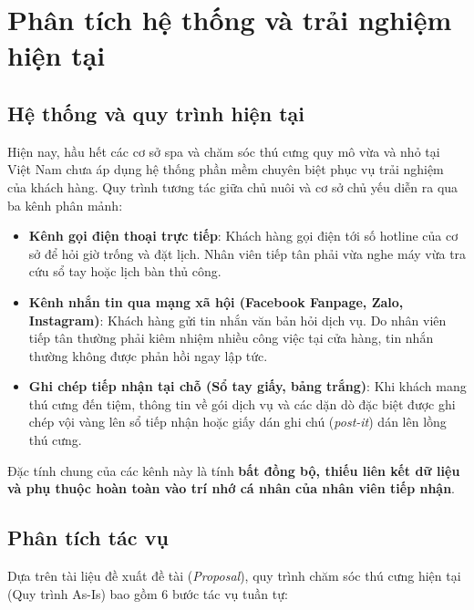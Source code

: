 \section{Phân tích hệ thống và trải nghiệm hiện tại}

\subsection{Hệ thống và quy trình hiện tại}
Hiện nay, hầu hết các cơ sở spa và chăm sóc thú cưng quy mô vừa và nhỏ tại Việt Nam chưa áp dụng hệ thống phần mềm chuyên biệt phục vụ trải nghiệm của khách hàng. Quy trình tương tác giữa chủ nuôi và cơ sở chủ yếu diễn ra qua ba kênh phân mảnh:
\begin{itemize}
    \item \textbf{Kênh gọi điện thoại trực tiếp}: Khách hàng gọi điện tới số hotline của cơ sở để hỏi giờ trống và đặt lịch. Nhân viên tiếp tân phải vừa nghe máy vừa tra cứu sổ tay hoặc lịch bàn thủ công.
    \item \textbf{Kênh nhắn tin qua mạng xã hội (Facebook Fanpage, Zalo, Instagram)}: Khách hàng gửi tin nhắn văn bản hỏi dịch vụ. Do nhân viên tiếp tân thường phải kiêm nhiệm nhiều công việc tại cửa hàng, tin nhắn thường không được phản hồi ngay lập tức.
    \item \textbf{Ghi chép tiếp nhận tại chỗ (Sổ tay giấy, bảng trắng)}: Khi khách mang thú cưng đến tiệm, thông tin về gói dịch vụ và các dặn dò đặc biệt được ghi chép vội vàng lên sổ tiếp nhận hoặc giấy dán ghi chú (\textit{post-it}) dán lên lồng thú cưng.
\end{itemize}

Đặc tính chung của các kênh này là tính \textbf{bất đồng bộ, thiếu liên kết dữ liệu và phụ thuộc hoàn toàn vào trí nhớ cá nhân của nhân viên tiếp nhận}.

\subsection{Phân tích tác vụ}
Dựa trên tài liệu đề xuất đề tài (\textit{Proposal}), quy trình chăm sóc thú cưng hiện tại (Quy trình As-Is) bao gồm 6 bước tác vụ tuần tự:


